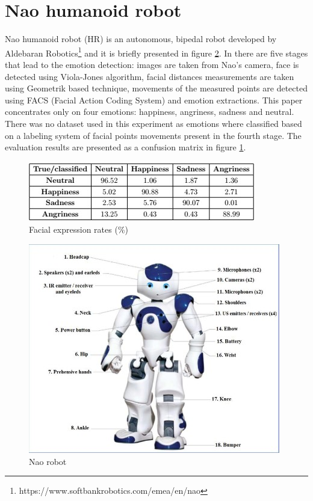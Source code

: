 \documentclass[runningheads,a4paper,12pt]{report}
\begin{document}
\section{Nao humanoid robot}
Nao humanoid robot (HR) is an autonomous, bipedal robot developed by Aldebaran Robotics\footnote{https://www.softbankrobotics.com/emea/en/nao} and it is briefly presented in figure \ref{fig:nao}. In \cite{nao-emotion} there are five stages that lead to the emotion detection: images are taken from Nao's camera, face is detected using Viola-Jones algorithm, facial distances measurements are taken using Geometrik based technique, movements of the measured points are detected using FACS (Facial Action Coding System) and emotion extractions. This paper concentrates only on four emotions: happiness, angriness, sadness and neutral. There was no dataset used in this experiment as emotions where classified based on a labeling system of facial points movements present in the fourth stage. The evaluation results are presented as a confusion matrix in figure \ref{table:nao}.

\begin{figure}[h]
	\centering
  	\includegraphics[width=0.7\linewidth]{./images/2_nao_table}
  	\caption{Facial expression rates (\%) \cite{nao-emotion}}
  	\label{table:nao}
\end{figure} 

\begin{figure}[h!]
	\centering
  	\includegraphics[width=0.6\linewidth]{./images/2_nao}
  	\caption{Nao robot \cite{nao}}
  	\label{fig:nao}
\end{figure} 
\end{document}
